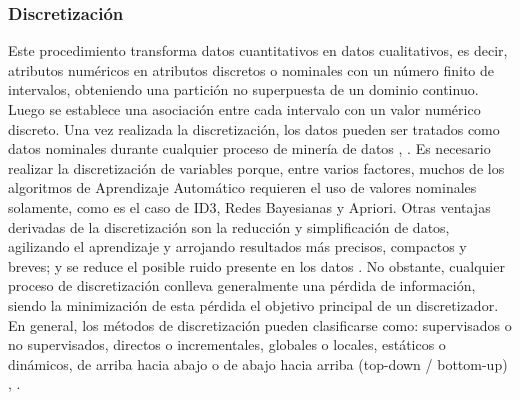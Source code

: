 \subsubsection*{Discretización}
Este procedimiento transforma datos cuantitativos en datos cualitativos, es decir, atributos numéricos en atributos discretos o nominales con un número finito de intervalos, obteniendo una partición no superpuesta de un dominio continuo. Luego se establece una asociación entre cada intervalo con un valor numérico discreto. Una vez realizada la discretización, los datos pueden ser tratados como datos nominales durante cualquier proceso de minería de datos \citep{garcia2015data}, \citep{garcia2012survey}.
Es necesario realizar la discretización de variables porque, entre varios factores, muchos de los algoritmos de Aprendizaje Automático requieren el uso de valores nominales solamente, como es el caso de ID3, Redes Bayesianas y Apriori. Otras ventajas derivadas de la discretización son la reducción y simplificación de datos, agilizando el aprendizaje y arrojando resultados más precisos, compactos y breves; y se reduce el posible ruido presente en los datos \citep{garcia2012survey}. No obstante, cualquier proceso de discretización conlleva generalmente una pérdida de información, siendo la minimización de esta pérdida el objetivo principal de un discretizador.\\
En general, los métodos de discretización pueden clasificarse como: supervisados o no supervisados, directos o incrementales, globales o locales, estáticos o dinámicos, de arriba hacia abajo o de abajo hacia arriba (top-down / bottom-up) \citep{garcia2012survey}, \citep{kotsiantis2006discretization}.
